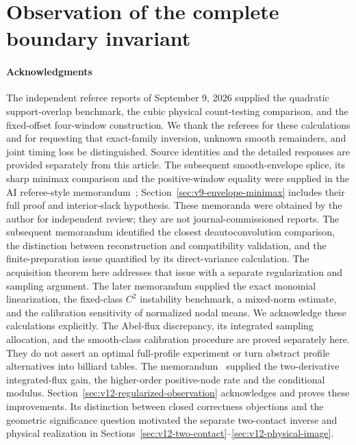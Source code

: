 \part{Observation of the complete boundary invariant}



\subsection*{Acknowledgments}
The independent referee reports of September 9, 2026 supplied the
quadratic support-overlap benchmark, the cubic physical count-testing
comparison, and the fixed-offset four-window construction. We thank the
referees for these calculations and for requesting that exact-family
inversion, unknown smooth remainders, and joint timing loss be
distinguished. Source identities and the detailed responses are
provided separately from this article. The subsequent smooth-envelope
splice, its sharp minimax comparison and the positive-window equality
were supplied in the AI referee-style memorandum~\cite{A2ReviewV8};
Section~\ref{sec:v9-envelope-minimax} includes their full proof and
interior-slack hypothesis. These memoranda were obtained by the author
for independent review; they are not journal-commissioned reports. The subsequent memorandum
\cite{A2ReviewV9} identified the closest deautoconvolution comparison,
the distinction between reconstruction and compatibility validation,
and the finite-preparation issue quantified by its direct-variance
calculation. The acquisition theorem here addresses that issue with
a separate regularization and sampling argument. The later memorandum
\cite{A2ReviewV10} supplied the exact monomial linearization,
the fixed-class $C^2$ instability benchmark, a mixed-norm estimate,
and the calibration sensitivity of normalized nodal means. We acknowledge
these calculations explicitly. The Abel-flux discrepancy, its integrated
sampling allocation, and the smooth-class calibration procedure are
proved separately here. They do not assert an optimal full-profile
experiment or turn abstract profile alternatives into billiard tables.
The memorandum~\cite{A2ReviewV11} supplied the two-derivative
integrated-flux gain, the higher-order positive-node rate and the
conditional modulus. Section~\ref{sec:v12-regularized-observation}
acknowledges and proves these improvements. Its distinction between
closed correctness objections and the geometric significance question
motivated the separate two-contact inverse and physical realization
in Sections~\ref{sec:v12-two-contact}--\ref{sec:v12-physical-image}.

